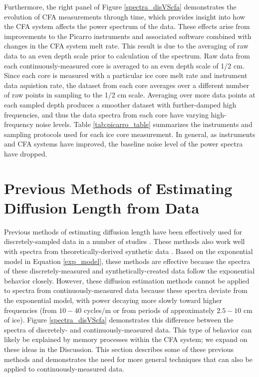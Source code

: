 \documentclass[draft, jgrga]{AGUTeX}
\begin{document}
\begin{article}
Furthermore, the right panel of Figure \ref{spectra_disVScfa} demonstrates the evolution of CFA measurements through time, which provides insight into how the CFA system affects the power spectrum of the data. These effects arise from improvements to the Picarro instruments and associated software combined with changes in the CFA system melt rate. This result is due to the averaging of raw data to an even depth scale prior to calculation of the spectrum. Raw data from each continuously-measured core is averaged to an even depth scale of 1/2 cm. Since each core is measured with a particular ice core melt rate and instrument data aquistion rate, the dataset from each core averages over a different number of raw points in sampling to the 1/2 cm scale. Averaging over more data points at each sampled depth produces a smoother dataset with further-damped high frequencies, and thus the data spectra from each core have varying high-frequency noise levels. Table \ref{tab:picarro_table} summarizes the instruments and sampling protocols used for each ice core measurement. In general, as instruments and CFA systems have improved, the baseline noise level of the power spectra have dropped.



\section{Previous Methods of Estimating Diffusion Length from Data}

Previous methods of estimating diffusion length have been effectively used for discretely-sampled data in a number of studies \citep{Johnsen2000,Simonsen2011,Gkinis2014,vanderWel2015}. These methods also work well with spectra from theoretically-derived synthetic data \citep{Holme2017}. Based on the exponential model in Equation \ref{exp_model}, these methods are effective because the spectra of these discretely-measured and synthetically-created data follow the exponential behavior closely. However, these diffusion estimation methods cannot be applied to spectra from continuously-measured data because these spectra deviate from the exponential model, with power decaying more slowly toward higher frequencies (from $10-40$ cycles/m or from periods of approximately $2.5-10$ cm of ice). Figure \ref{spectra_disVScfa} demonstrates this difference between the spectra of discretely- and continuously-measured data. This type of behavior can likely be explained by memory processes within the CFA system; we expand on these ideas in the Discussion.  This section describes some of these previous methods and demonstrates the need for more general techniques that can also be applied to continuously-measured data.


\end{article}
\end{document}
